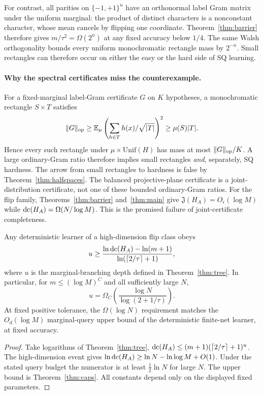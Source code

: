 For contrast, all parities on $\{-1,+1\}^n$ have an orthonormal label Gram matrix under the uniform marginal: the product of distinct characters is a nonconstant character, whose mean cancels by flipping one coordinate. Theorem~\ref{thm:barrier} therefore gives $m/\tau^2=\Omega(2^n)$ at any fixed accuracy below $1/4$. The same Walsh orthogonality bounds every uniform monochromatic rectangle mass by $2^{-n}$. Small rectangles can therefore occur on either the easy or the hard side of SQ learning.



\paragraph{Why the spectral certificates miss the counterexample.}
For a fixed-marginal label-Gram certificate $G$ on $K$ hypotheses, a monochromatic rectangle $S\times T$ satisfies
\[
 \|G\|_{\rm op}\ge\mathbb E_\mu\left(\sum_{h\in T}h(x)/\sqrt{|T|}\right)^2
 \ge\mu(S)|T|.
\]
Hence every such rectangle under $\mu\times\mathrm{Unif}(H)$ has mass at most $\|G\|_{\rm op}/K$. A large ordinary-Gram ratio therefore implies small rectangles \emph{and}, separately, SQ hardness. The arrow from small rectangles to hardness is false by Theorem~\ref{thm:halfspaces}. The balanced projective-plane certificate is a joint-distribution certificate, not one of these bounded ordinary-Gram ratios. For the flip family, Theorems~\ref{thm:barrier} and~\ref{thm:main} give $\mathfrak J(H_A)=O_\epsilon(\log M)$ while $\operatorname{dc}(H_A)=\Omega(N/\log M)$. This is the promised failure of joint-certificate completeness.

\begin{samepage}
\begin{theorem}\label{thm:adapt}
Any deterministic learner of a high-dimension flip class obeys
\[
 u\ge\frac{\ln\operatorname{dc}(H_A)-\ln(m+1)}
 {\ln(\lceil2/\tau\rceil+1)},
\]
where $u$ is the marginal-branching depth defined in Theorem~\ref{thm:tree}. In particular, for $m\le(\log M)^C$ and all sufficiently large $N$,
\[
 u=\Omega_C\!\left(\frac{\log N}{\log(2+1/\tau)}\right).
\]
At fixed positive tolerance, the $\Omega(\log N)$ requirement matches the $O_d(\log M)$ marginal-query upper bound of the deterministic finite-net learner, at fixed accuracy.
\end{theorem}
\end{samepage}
\begin{proof}
Take logarithms of Theorem~\ref{thm:tree}, $\operatorname{dc}(H_A)\le(m+1)(\lceil2/\tau\rceil+1)^u$. The high-dimension event gives $\ln\operatorname{dc}(H_A)\ge\ln N-\ln\log M+O(1)$. Under the stated query budget the numerator is at least $\tfrac12\ln N$ for large $N$. The upper bound is Theorem~\ref{thm:caps}. All constants depend only on the displayed fixed parameters.
\end{proof}


